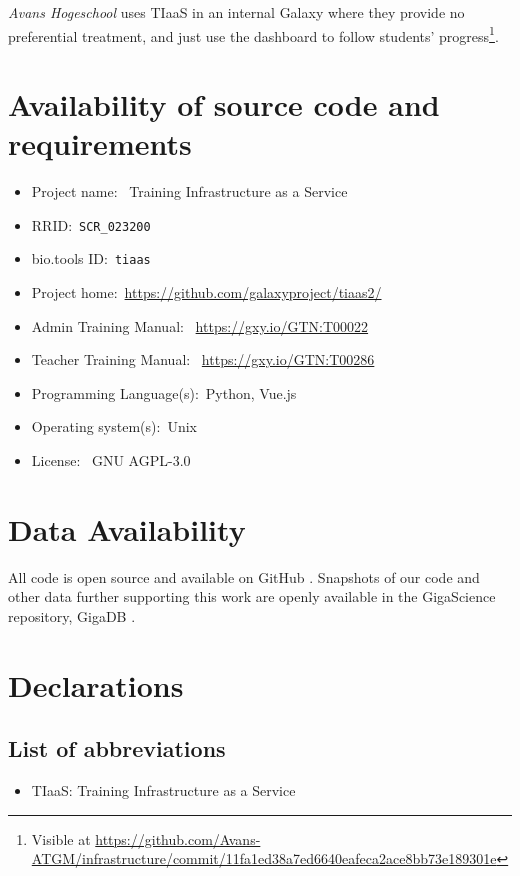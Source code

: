 \emph{Avans Hogeschool} uses TIaaS in an internal Galaxy where they provide no preferential treatment, and just use the dashboard to follow students' progress\footnote{Visible at \url{https://github.com/Avans-ATGM/infrastructure/commit/11fa1ed38a7ed6640eafeca2ace8bb73e189301e}}.

\section*{Availability of source code and requirements}

\begin{itemize}
\item Project name: ~Training Infrastructure as a Service
\item RRID:~\texttt{SCR\_023200}
\item bio.tools ID:~\texttt{tiaas}
\item Project home:~\url{https://github.com/galaxyproject/tiaas2/}
\item Admin Training Manual: ~\url{https://gxy.io/GTN:T00022}
\item Teacher Training Manual: ~\url{https://gxy.io/GTN:T00286}
\item Programming Language(s):~Python, Vue.js
\item Operating system(s):~Unix
\item License: ~GNU AGPL-3.0
\end{itemize}

\section*{Data Availability}
All code is open source and available on GitHub \cite{gh:tiaas2,gh:ansible-tiaas2}. Snapshots of our code and other data further supporting this work are openly available in the GigaScience repository, GigaDB \cite{gigadb102406}.

\section*{Declarations}

\subsection*{List of abbreviations}
\begin{itemize}
\item TIaaS: Training Infrastructure as a Service
\end{itemize}

